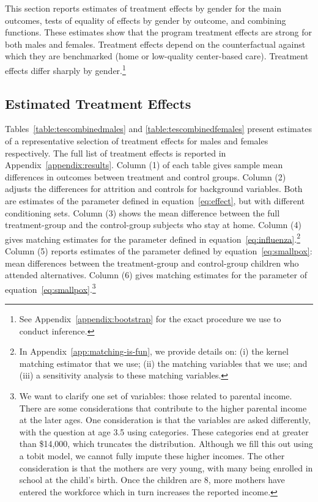 This section reports estimates of treatment effects by gender for the main outcomes, tests of equality of effects by gender by outcome, and combining functions. These estimates show that the program treatment effects are strong for both males and females. Treatment effects depend on the counterfactual against which they are benchmarked (home or low-quality center-based care). Treatment effects differ sharply by gender.\footnote{See Appendix~\ref{appendix:bootstrap} for the exact procedure we use to conduct inference.}

\subsection{Estimated Treatment Effects}

Tables~\ref{table:tescombinedmales} and \ref{table:tescombinedfemales} present estimates of a representative selection of treatment effects for males and females respectively. The full list of treatment effects is reported in Appendix~\ref{appendix:results}. Column (1) of each table gives sample mean differences in outcomes between treatment and control groups. Column (2) adjusts the differences for attrition and controls for background variables. Both are estimates of the parameter defined in equation~\eqref{eq:effect}, but with different conditioning sets. Column (3) shows the mean difference between the full treatment-group and the control-group subjects who stay at home. Column (4) gives matching estimates for the parameter defined in equation~\eqref{eq:influenza}.\footnote{In Appendix~\ref{app:matching-is-fun}, we provide details on: (i) the kernel matching estimator that we use; (ii) the matching variables that we use; and (iii) a sensitivity analysis to these matching variables.} Column (5) reports estimates of the parameter defined by equation~\eqref{eq:smallpox}: mean differences between the treatment-group and control-group children who attended alternatives. Column (6) gives matching estimates for the parameter of equation~\eqref{eq:smallpox}.\footnote{We want to clarify one set of variables: those related to parental income. There are some considerations that contribute to the higher parental income at the later ages. One consideration is that the variables are asked differently, with the question at age 3.5 using categories. These categories end at greater than \$14,000, which truncates the distribution. Although we fill this out using a tobit model, we cannot fully impute these higher incomes. The other consideration is that the mothers are very young, with many being enrolled in school at the child's birth. Once the children are 8, more mothers have entered the workforce which in turn increases the reported income.}


